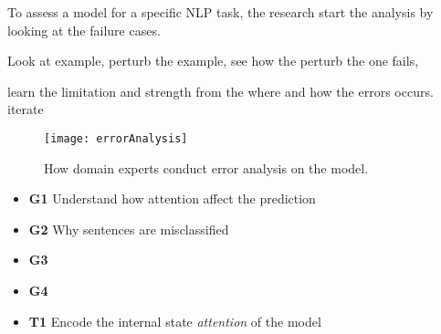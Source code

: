 %
%
To assess a model for a specific NLP task, the research start the analysis by looking at the failure cases.

Look at example, perturb the example, see how the perturb the one fails,

learn the limitation and strength from the where and how the errors occurs. iterate 


\begin{figure}[htbp]
\centering
\vspace{-2mm}
 \texttt{[image: errorAnalysis]}
 \caption{How domain experts conduct error analysis on the model.}
\label{fig:modelPipeline}
\end{figure}

\begin{itemize}
\item \textbf{G1} Understand how attention affect the prediction 
\item \textbf{G2} Why sentences are misclassified 
\item \textbf{G3} 
\item \textbf{G4} 
\end{itemize}

\begin{itemize}
\item \textbf{T1} Encode the internal state \emph{attention} of the model
\end{itemize}
